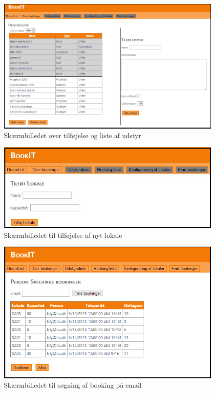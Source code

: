 \begin{figure}[h!]
  \centering
    \includegraphics[angle=90, height=\textheight]{Appendix/GUI-Prototype/DigitalMockup/UdstyrsListe}
  \caption{Skærmbilledet over tilføjelse og liste af udstyr}
\label{App_GUI_final_UdstyrsListe}
\end{figure}

\begin{figure}[h!]
  \centering
    \includegraphics[width=\textwidth]{Appendix/GUI-Prototype/DigitalMockup/AddRoom}
  \caption{Skærmbilledet til tilføjelse af nyt lokale}
\label{App_GUI_final_AddRoom}
\end{figure}

\begin{figure}[h!]
  \centering
    \includegraphics[angle=90, height=\textheight]{Appendix/GUI-Prototype/DigitalMockup/SpecifikBookingListe}
  \caption{Skærmbilledet til søgning af booking på email}
\label{App_GUI_final_SpecifikBookingListe}
\end{figure}

